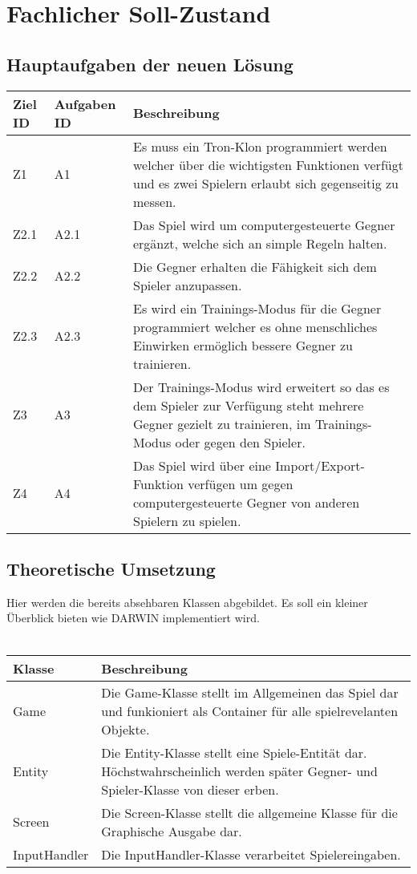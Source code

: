 \usetikzlibrary{arrows,positioning}
\section{Fachlicher Soll-Zustand}


\subsection{Hauptaufgaben der neuen Lösung}

\begin{tabularx}{\textwidth}{| p{0.7cm} | p{1.5cm} | X |}
\hline
\rowcolor[gray]{0.9} Ziel ID & Aufgaben ID & Beschreibung \\
\hline
Z1 & A1 & Es muss ein Tron-Klon programmiert werden welcher über die wichtigsten Funktionen verfügt und es zwei Spielern erlaubt sich gegenseitig zu messen.\\
\hline
Z2.1 & A2.1 & Das Spiel wird um computergesteuerte Gegner ergänzt, welche sich an simple Regeln halten. \\
\hline
Z2.2 & A2.2 & Die Gegner erhalten die Fähigkeit sich dem Spieler anzupassen. \\
\hline 
Z2.3 & A2.3 & Es wird ein Trainings-Modus für die Gegner programmiert welcher es ohne menschliches Einwirken ermöglich bessere Gegner zu trainieren. \\
\hline
Z3 & A3 & Der Trainings-Modus wird erweitert so das es dem Spieler zur Verfügung steht mehrere Gegner gezielt zu trainieren, im Trainings-Modus oder gegen den Spieler. \\
\hline
Z4 & A4 & Das Spiel wird über eine Import/Export-Funktion verfügen um gegen computergesteuerte Gegner von anderen Spielern zu spielen. \\
\hline
\end{tabularx}

\subsection{Theoretische Umsetzung}

Hier werden die bereits absehbaren Klassen abgebildet. Es soll ein kleiner Überblick bieten wie DARWIN implementiert wird. 
\\ \\
\begin{tabularx}{\textwidth}{| p{4.5cm} | X |}
\hline
\rowcolor[gray]{0.9} Klasse & Beschreibung \\
\hline
Game & Die Game-Klasse stellt im Allgemeinen das Spiel dar und funkioniert als Container für alle spielrevelanten Objekte. \\
\hline
Entity & Die Entity-Klasse stellt eine Spiele-Entität dar. Höchstwahrscheinlich werden später Gegner- und Spieler-Klasse von dieser erben. \\
\hline
Screen & Die Screen-Klasse stellt die allgemeine Klasse für die Graphische Ausgabe dar. \\
\hline
InputHandler & Die InputHandler-Klasse verarbeitet Spielereingaben. \\
\hline
\end{tabularx}